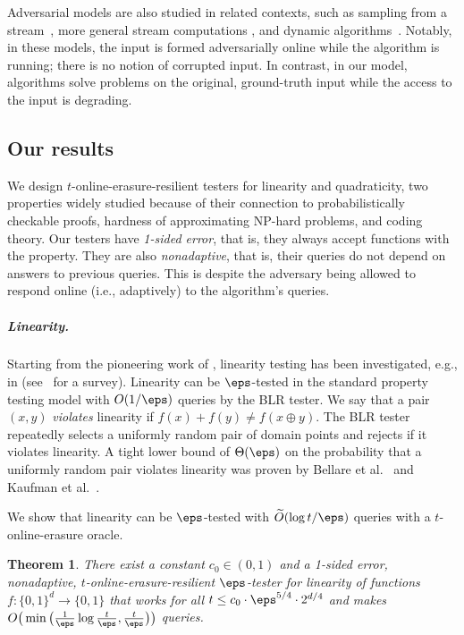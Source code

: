 \documentclass[11pt]{article}
\numberwithin{equation}{section}
\newtheorem{theorem}{Theorem}[section]
\theoremstyle{definition}
\theoremstyle{plain}
\begin{document}
Adversarial models are also studied in related contexts, such as sampling from  a stream~\cite{Ben-EliezerY20}, more general stream computations \cite{Ben-EliezerJWY22}, and dynamic algorithms~\cite{BeimelKMNSS22}. 
Notably, in these models, the input is formed adversarially online while the algorithm is running; there is no notion of corrupted input. In contrast, in our model, algorithms solve problems on the original, ground-truth input while the access to the input is degrading. 




%
\subsection{Our results}\label{sec:results}

We design 
$t$-online-erasure-resilient testers for linearity and quadraticity, two properties widely studied because of their connection to probabilistically checkable proofs, %
hardness of approximating NP-hard problems, and coding theory. 
%
%
Our testers have {\em 1-sided error}, that is, they always accept functions with the property. They are also {\em nonadaptive}, that is, their queries do not depend on answers to previous queries. This is despite the adversary being allowed to respond online (i.e., adaptively) to the algorithm's queries.


\subparagraph*{Linearity.} 
%

Starting from the pioneering work of \cite{BlumLR93}, linearity testing has been investigated, e.g., in \cite{BellareGLR93, BellareS94, FeigeGLSS96, BellareCHKS96, BellareGS98, Trevisan98, SudanT98,  SamorodnitskyT00, HastadW03,Ben-SassonSVW03, Samorodnitsky07, SamorodnitskyT09, ShpilkaW06, KaufmanLX10} (see~\cite{RasR16} for a survey). 
%
%
%
%
Linearity can be $\eps$-tested in the standard property testing model with $O(1/\eps)$ queries by the BLR tester. We say that a pair $(x, y)$ \emph{violates} linearity if $f(x) + f(y) \neq f(x \oplus y)$. The BLR tester repeatedly selects 
%
a uniformly random pair of domain points and rejects if it violates linearity.
A tight lower bound of $\Theta(\eps)$ on the probability that a uniformly random pair violates linearity
was proven by Bellare et al.~\cite{BellareCHKS96} and Kaufman et al.~\cite{KaufmanLX10}.

We show that linearity can be $\eps$-tested with $\widetilde O(\log t/\eps)$ queries with a $t$-online-erasure oracle. 

\begin{theorem}
\label{thm:linearity_min}
There exist a constant $c_0 \in (0,1)$ and a 1-sided error, nonadaptive, $t$-online-erasure-resilient $\eps$-tester for linearity of functions $f\colon \{0,1\}^d \to \{0,1\}$ that  works for all $t \leq c_0\cdot\eps^{5/4} \cdot  2^{d/4}$ and makes $O\big(\min\big( \frac{1}{\eps}\log \frac{t}{\eps}, \frac t \eps\big)\big)$ queries.
\end{theorem}
\end{document}
